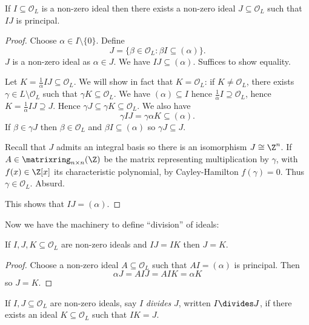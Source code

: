 \documentclass[a4paper]{article}
\renewcommand*{\O}{\mathcal{O}}
\begin{document}
\begin{proposition}
  If \(I \subseteq \O_L\) is a non-zero ideal then there exists a non-zero ideal \(J \subseteq \O_L\) such that \(IJ\) is principal.
\end{proposition}

\begin{proof}
  Choose \(\alpha \in I \setminus \{0\}\). Define
  \[
    J = \{\beta \in \O_L: \beta I \subseteq (\alpha)\}.
  \]
  \(J\) is a non-zero ideal as \(\alpha \in J\). We have \(IJ \subseteq (\alpha)\). Suffices to show equality.

  Let \(K = \frac{1}{\alpha}IJ \subseteq \O_L\). We will show in fact that \(K = \O_L\): if \(K \neq \O_L\), there exists \(\gamma \in L \setminus \O_L\) such that \(\gamma K \subseteq \O_L\). We have \((\alpha) \subseteq I\) hence \(\frac{1}{\alpha} I \supseteq \O_L\), hence \(K = \frac{1}{\alpha}IJ \supseteq J\). Hence \(\gamma J \subseteq \gamma K \subseteq \O_L\). We also have
  \[
    \gamma IJ = \gamma \alpha K \subseteq (\alpha).
  \]
  If \(\beta \in \gamma J\) then \(\beta \in \O_L\) and \(\beta I \subseteq (\alpha)\) so \(\gamma J \subseteq J\).

  Recall that \(J\) admits an integral basis so there is an isomorphism \(J \cong \Z^n\). If \(A \in \matrixring_{n \times n}(\Z)\) be the matrix representing multiplication by \(\gamma\), with \(f(x) \in \Z[x]\) its characteristic polynomial, by Cayley-Hamilton \(f(\gamma) = 0\). Thus \(\gamma \in \O_L\). Absurd.

  This shows that \(IJ = (\alpha)\).
\end{proof}

Now we have the machinery to define ``division'' of ideals:

\begin{corollary}
  If \(I, J, K \subseteq \O_L\) are non-zero ideals and \(IJ = IK\) then \(J = K\).
\end{corollary}

\begin{proof}
  Choose a non-zero ideal \(A \subseteq \O_L\) such that \(AI = (\alpha)\) is principal. Then
  \[
    \alpha J = AIJ = AIK = \alpha K
  \]
  so \(J = K\).
\end{proof}

\begin{definition}
  If \(I, J \subseteq \O_L\) are non-zero ideals, say \(I\) \emph{divides} \(J\), written \(I \divides J\), if there exists an ideal \(K \subseteq \O_L\) such that \(IK = J\).
\end{definition}
\end{document}
